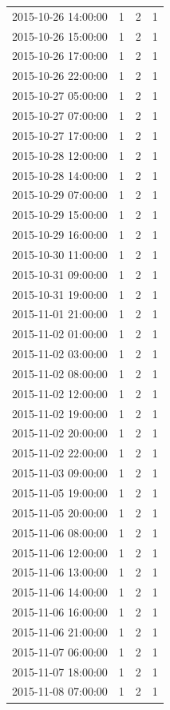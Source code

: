 \begin{tabular}{lrrr}
2015-10-26 14:00:00 & 1 & 2 & 1 \\
2015-10-26 15:00:00 & 1 & 2 & 1 \\
2015-10-26 17:00:00 & 1 & 2 & 1 \\
2015-10-26 22:00:00 & 1 & 2 & 1 \\
2015-10-27 05:00:00 & 1 & 2 & 1 \\
2015-10-27 07:00:00 & 1 & 2 & 1 \\
2015-10-27 17:00:00 & 1 & 2 & 1 \\
2015-10-28 12:00:00 & 1 & 2 & 1 \\
2015-10-28 14:00:00 & 1 & 2 & 1 \\
2015-10-29 07:00:00 & 1 & 2 & 1 \\
2015-10-29 15:00:00 & 1 & 2 & 1 \\
2015-10-29 16:00:00 & 1 & 2 & 1 \\
2015-10-30 11:00:00 & 1 & 2 & 1 \\
2015-10-31 09:00:00 & 1 & 2 & 1 \\
2015-10-31 19:00:00 & 1 & 2 & 1 \\
2015-11-01 21:00:00 & 1 & 2 & 1 \\
2015-11-02 01:00:00 & 1 & 2 & 1 \\
2015-11-02 03:00:00 & 1 & 2 & 1 \\
2015-11-02 08:00:00 & 1 & 2 & 1 \\
2015-11-02 12:00:00 & 1 & 2 & 1 \\
2015-11-02 19:00:00 & 1 & 2 & 1 \\
2015-11-02 20:00:00 & 1 & 2 & 1 \\
2015-11-02 22:00:00 & 1 & 2 & 1 \\
2015-11-03 09:00:00 & 1 & 2 & 1 \\
2015-11-05 19:00:00 & 1 & 2 & 1 \\
2015-11-05 20:00:00 & 1 & 2 & 1 \\
2015-11-06 08:00:00 & 1 & 2 & 1 \\
2015-11-06 12:00:00 & 1 & 2 & 1 \\
2015-11-06 13:00:00 & 1 & 2 & 1 \\
2015-11-06 14:00:00 & 1 & 2 & 1 \\
2015-11-06 16:00:00 & 1 & 2 & 1 \\
2015-11-06 21:00:00 & 1 & 2 & 1 \\
2015-11-07 06:00:00 & 1 & 2 & 1 \\
2015-11-07 18:00:00 & 1 & 2 & 1 \\
2015-11-08 07:00:00 & 1 & 2 & 1 \\

\end{tabular}
